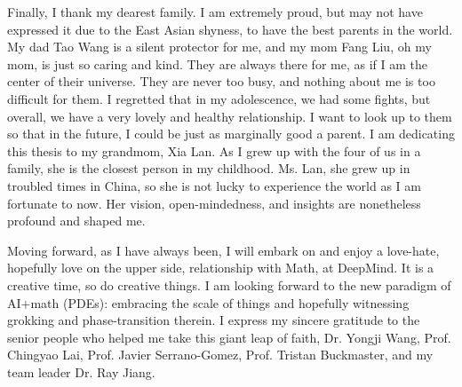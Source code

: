\documentclass[12pt]{caltech_thesis}
\numberwithin{equation}{section}
\begin{document}
\begin{acknowledgements}
Finally, I thank my dearest family. I am extremely proud, but may not have expressed it due to the East Asian shyness, to have the best parents in the world. My dad Tao Wang is a silent protector for me, and my mom Fang Liu, oh my mom, is just so caring and kind. They are always there for me, as if I am the center of their universe. They are never too busy, and nothing about me is too difficult for them. I regretted that in my adolescence, we had some fights, but overall, we have a very lovely and healthy relationship. I want to look up to them so that in the future, I could be just as marginally good a parent.
 I am dedicating this thesis to my grandmom, Xia Lan. As I grew up with the four of us in a family, she is the closest person in my childhood. Ms. Lan, she grew up in troubled times in China, so she is not lucky to experience the world as I am fortunate to now. Her vision, open-mindedness, and insights are nonetheless profound and shaped me.

Moving forward, as I have always been, I will embark on and enjoy a love-hate, hopefully love on the upper side, relationship with Math, at DeepMind. It is a creative time, so do creative things. I am looking forward to the new paradigm of AI+math (PDEs): embracing the scale of things and hopefully witnessing grokking and phase-transition therein. I express my sincere gratitude to the senior people who helped me take this giant leap of faith, Dr. Yongji Wang, Prof. Chingyao Lai, Prof. Javier Serrano-Gomez,  Prof. Tristan Buckmaster, and my team leader Dr. Ray Jiang.
\end{acknowledgements}
\end{document}
